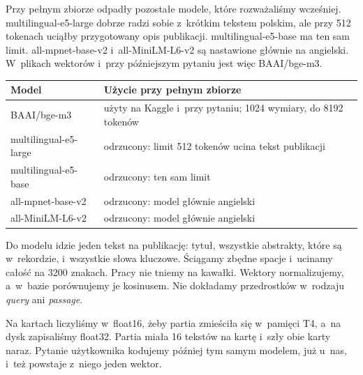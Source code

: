 \documentclass[11pt,a4paper]{article}
\begin{document}
Przy pełnym zbiorze odpadły pozostałe modele, które rozważaliśmy wcześniej. multilingual-e5-large dobrze radzi sobie z~krótkim tekstem polskim, ale przy 512 tokenach uciąłby przygotowany opis publikacji. multilingual-e5-base ma ten sam limit. all-mpnet-base-v2 i~all-MiniLM-L6-v2 są nastawione głównie na angielski. W~plikach wektorów i~przy późniejszym pytaniu jest więc BAAI/bge-m3.

\begin{center}
\begin{tabularx}{\textwidth}{|L{0.38\textwidth}|Y|}
\hline
\textbf{Model} & \textbf{Użycie przy pełnym zbiorze} \\
\hline
BAAI/bge-m3 & użyty na Kaggle i~przy pytaniu; 1024 wymiary, do 8192 tokenów \\
\hline
multilingual-e5-large & odrzucony: limit 512 tokenów ucina tekst publikacji \\
\hline
multilingual-e5-base & odrzucony: ten sam limit \\
\hline
all-mpnet-base-v2 & odrzucony: model głównie angielski \\
\hline
all-MiniLM-L6-v2 & odrzucony: model głównie angielski \\
\hline
\end{tabularx}
\end{center}

Do modelu idzie jeden tekst na publikację: tytuł, wszystkie abstrakty, które są w~rekordzie, i~wszystkie słowa kluczowe. Ściągamy zbędne spacje i~ucinamy całość na 3200 znakach. Pracy nie tniemy na kawałki. Wektory normalizujemy, a~w~bazie porównujemy je kosinusem. Nie dokładamy przedrostków w~rodzaju \emph{query} ani \emph{passage}.

Na kartach liczyliśmy w~float16, żeby partia zmieściła się w~pamięci T4, a~na dysk zapisaliśmy float32. Partia miała 16 tekstów na kartę i~szły obie karty naraz. Pytanie użytkownika kodujemy później tym samym modelem, już u~nas, i~też powstaje z~niego jeden wektor.
\end{document}
